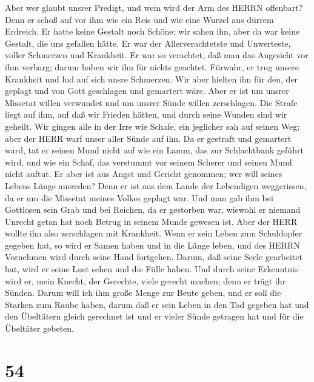  Aber wer glaubt unsrer Predigt, und wem wird der Arm des
HERRN offenbart?  Denn er schoß auf vor ihm wie ein Reis und
wie eine Wurzel aus dürrem Erdreich. Er hatte keine Gestalt noch Schöne;
wir sahen ihn, aber da war keine Gestalt, die uns gefallen hätte.
 Er war der Allerverachtetste und Unwerteste, voller
Schmerzen und Krankheit. Er war so verachtet, daß man das Angesicht vor
ihm verbarg; darum haben wir ihn für nichts geachtet. 
Fürwahr, er trug unsere Krankheit und lud auf sich unsre Schmerzen. Wir
aber hielten ihn für den, der geplagt und von Gott geschlagen und
gemartert wäre.  Aber er ist um unsrer Missetat willen
verwundet und um unsrer Sünde willen zerschlagen. Die Strafe liegt auf
ihm, auf daß wir Frieden hätten, und durch seine Wunden sind wir
geheilt.  Wir gingen alle in der Irre wie Schafe, ein
jeglicher sah auf seinen Weg; aber der HERR warf unser aller Sünde auf
ihn.  Da er gestraft und gemartert ward, tat er seinen Mund
nicht auf wie ein Lamm, das zur Schlachtbank geführt wird, und wie ein
Schaf, das verstummt vor seinem Scherer und seinen Mund nicht auftut.
 Er aber ist aus Angst und Gericht genommen; wer will seines
Lebens Länge ausreden? Denn er ist aus dem Lande der Lebendigen
weggerissen, da er um die Missetat meines Volkes geplagt war.
 Und man gab ihm bei Gottlosen sein Grab und bei Reichen, da
er gestorben war, wiewohl er niemand Unrecht getan hat noch Betrug in
seinem Munde gewesen ist.  Aber der HERR wollte ihn also
zerschlagen mit Krankheit. Wenn er sein Leben zum Schuldopfer gegeben
hat, so wird er Samen haben und in die Länge leben, und des HERRN
Vornehmen wird durch seine Hand fortgehen.  Darum, daß
seine Seele gearbeitet hat, wird er seine Lust sehen und die Fülle
haben. Und durch seine Erkenntnis wird er, mein Knecht, der Gerechte,
viele gerecht machen; denn er trägt ihr Sünden.  Darum will
ich ihm große Menge zur Beute geben, und er soll die Starken zum Raube
haben, darum daß er sein Leben in den Tod gegeben hat und den Übeltätern
gleich gerechnet ist und er vieler Sünde getragen hat und für die
Übeltäter gebeten.

\hypertarget{section-53}{%
\section{54}\label{section-53}}

